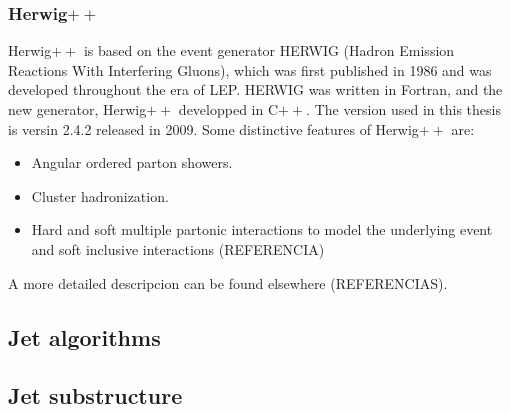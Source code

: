 \subsubsection{Herwig$++$}

Herwig$++$ is based on the event generator HERWIG (Hadron Emission Reactions With Interfering Gluons), which was first published in 1986 and was developed throughout the era of LEP.  HERWIG was written in Fortran, and the new generator, Herwig$++$ developped in C$++$. The version used in this thesis is versin 2.4.2 released in 2009. Some distinctive features of Herwig$++$ are:

\begin{itemize}\addtolength{\itemsep}{-0.4\baselineskip}
\item
Angular ordered parton showers.
\item
Cluster hadronization.

\item 
Hard and soft multiple partonic interactions to model the underlying event and soft inclusive interactions (REFERENCIA) %
\end{itemize}


A more detailed descripcion can be found elsewhere (REFERENCIAS).

\subsection{Jet algorithms}

\subsection{Jet substructure}
